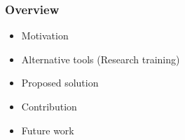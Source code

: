 \begin{frame}
\frametitle{Overview}
	\begin{block}{}
		\begin{itemize}
			\item Motivation
			\item Alternative tools (Research training)
			\item Proposed solution
			\item Contribution
			\item Future work
		\end{itemize}
	\end{block}
\end{frame}
